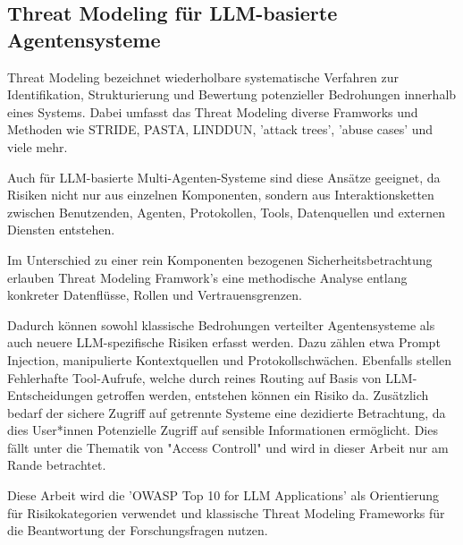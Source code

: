\subsection{Threat Modeling für LLM-basierte Agentensysteme}

Threat Modeling bezeichnet wiederholbare systematische Verfahren zur Identifikation, Strukturierung und Bewertung potenzieller Bedrohungen innerhalb eines Systems. \cite{owasp_owasp_nodate, shostack2014threat} Dabei umfasst das Threat Modeling diverse Framworks und Methoden wie STRIDE, PASTA, LINDDUN, 'attack trees', 'abuse cases' und viele mehr. \cite{owasp_owasp_nodate}

Auch für LLM-basierte Multi-Agenten-Systeme sind diese Ansätze geeignet, da Risiken nicht nur aus einzelnen Komponenten, sondern aus Interaktionsketten zwischen Benutzenden, Agenten, Protokollen, Tools, Datenquellen und externen Diensten entstehen. \cite{krawiecka_extending_2025}

Im Unterschied zu einer rein Komponenten bezogenen Sicherheitsbetrachtung erlauben Threat Modeling Framwork's eine methodische Analyse entlang konkreter Datenflüsse, Rollen und Vertrauensgrenzen. \cite{shostack2014threat, owasp_owasp_nodate, wong_adding_2000}

Dadurch können sowohl klassische Bedrohungen verteilter Agentensysteme als auch neuere LLM-spezifische Risiken erfasst werden. \cite{krawiecka_extending_2025, noauthor_threat_2026}
Dazu zählen etwa Prompt Injection, manipulierte Kontextquellen und Protokollschwächen. Ebenfalls stellen Fehlerhafte Tool-Aufrufe, welche durch reines Routing auf Basis von LLM-Entscheidungen getroffen werden, entstehen können ein Risiko da.  Zusätzlich bedarf der sichere Zugriff auf getrennte Systeme eine dezidierte Betrachtung, da dies User*innen Potenzielle Zugriff auf sensible Informationen ermöglicht. Dies fällt unter die Thematik von "Access Controll" und wird in dieser Arbeit nur am Rande betrachtet. \cite{ferrag_prompt_2026, anbiaee_security_2026, zhang_agent_2026, krawiecka_extending_2025}

Diese Arbeit wird die 'OWASP Top 10 for LLM Applications' \cite{editor_owasp_nodate} als Orientierung für Risikokategorien verwendet und klassische Threat Modeling Frameworks für die Beantwortung der Forschungsfragen nutzen.

\newpage